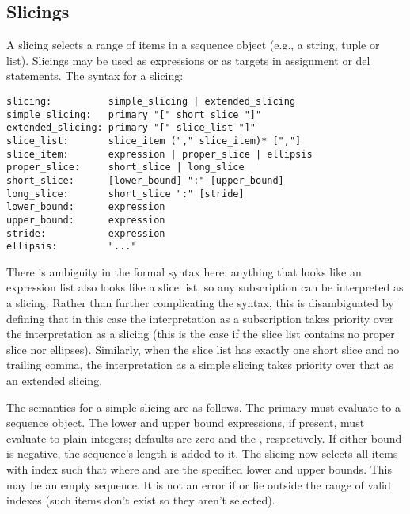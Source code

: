 \subsection{Slicings\label{slicings}}

A slicing selects a range of items in a sequence object (e.g., a
string, tuple or list).  Slicings may be used as expressions or as
targets in assignment or del statements.  The syntax for a slicing:

\begin{verbatim}
slicing:          simple_slicing | extended_slicing
simple_slicing:   primary "[" short_slice "]"
extended_slicing: primary "[" slice_list "]" 
slice_list:       slice_item ("," slice_item)* [","]
slice_item:       expression | proper_slice | ellipsis
proper_slice:     short_slice | long_slice
short_slice:      [lower_bound] ":" [upper_bound]
long_slice:       short_slice ":" [stride]
lower_bound:      expression
upper_bound:      expression
stride:           expression
ellipsis:         "..."
\end{verbatim}

There is ambiguity in the formal syntax here: anything that looks like
an expression list also looks like a slice list, so any subscription
can be interpreted as a slicing.  Rather than further complicating the
syntax, this is disambiguated by defining that in this case the
interpretation as a subscription takes priority over the
interpretation as a slicing (this is the case if the slice list
contains no proper slice nor ellipses).  Similarly, when the slice
list has exactly one short slice and no trailing comma, the
interpretation as a simple slicing takes priority over that as an
extended slicing.

The semantics for a simple slicing are as follows.  The primary must
evaluate to a sequence object.  The lower and upper bound expressions,
if present, must evaluate to plain integers; defaults are zero and the
, respectively.  If either bound is negative, the
sequence's length is added to it.  The slicing now selects all items
with index  such that
 where 
and  are the specified lower and upper bounds.  This may be an
empty sequence.  It is not an error if  or  lie outside the
range of valid indexes (such items don't exist so they aren't
selected).

